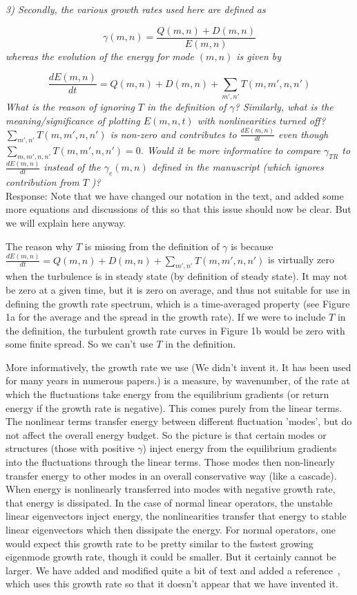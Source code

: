 \documentclass[12pt]{article}
\def\beq{\begin{equation}}
\def\eeq{\end{equation}}
\newcommand{\diff}[2]{\frac{d#1}{d#2}}
\begin{document}
\emph{3) Secondly, the various growth rates used here are defined as}

\beq
\gamma(m,n) = \frac{Q(m,n) + D(m,n)}{E(m,n)} \nonumber
\eeq
\emph{whereas the evolution of the energy for mode $(m, n)$ is given by}

\beq
\diff{E(m,n)}{t} = Q(m,n) + D(m,n) + \sum_{m',n'} T(m,m',n,n') \nonumber
\eeq
\emph{What is the reason of ignoring $T$ in the definition of $\gamma$? Similarly, what is the meaning/significance
of plotting $E(m, n, t)$ with nonlinearities turned off?  $\sum_{m',n'} T(m,m',n,n')$ is non-zero and contributes to 
$\diff{E(m, n)}{t}$ even though $\sum_{m,m',n,n'} T(m,m',n,n') = 0$. Would it be more informative
to compare $\gamma_{TR}$ to $\diff{E(m, n)}{t}$ instead of the $\gamma_e (m, n)$ defined in the manuscript (which ignores
contribution from $T$ )?} \\


Response: Note that we have changed our notation in the text, and added some more equations and discussions of this so that this issue should now be clear. But we will explain here anyway. 

The reason why $T$ is missing from the definition of $\gamma$ is because $\diff{E(m,n)}{t} = Q(m,n) + D(m,n) + \sum_{m',n'} T(m,m',n,n')$ is virtually zero when the turbulence is in steady state (by definition of steady state). It may not be zero at a given time, but it is zero on average, and thus not suitable for use in defining the growth rate spectrum, which is a time-averaged property (see Figure 1a for the average and the spread in the growth rate). If we were to include $T$ in the definition, the turbulent growth rate curves in Figure 1b would be zero with some finite spread. So we can't use $T$ in the definition.

More informatively, the growth rate we use (We didn't invent it. It has been used for many years in numerous papers.) is a measure, by wavenumber, of the rate at which the fluctuations take energy from the equilibrium gradients (or return energy if the growth rate is negative). This comes purely from the linear terms. The nonlinear terms transfer energy between different fluctuation 'modes', but do not affect the overall energy budget.
So the picture is that certain modes or structures (those with positive $\gamma$) inject energy from the equilibrium gradients into the fluctuations through the linear terms. Those modes then non-linearly transfer energy to other modes in an overall conservative way (like a cascade). When energy is nonlinearly transferred into modes with negative growth rate, that energy is dissipated. In the case of normal linear operators, the unstable linear eigenvectors inject energy, the nonlinearities transfer that energy to stable linear eigenvectors which then dissipate the energy. For normal operators, one would expect this growth rate to be pretty similar to the fastest growing eigenmode growth rate, though it could be smaller. But it certainly cannot be larger. We have added and modified quite a bit of text and added a reference~\cite{terry2006b}, which uses this growth rate so that it doesn't appear that we have invented it.
\end{document}
